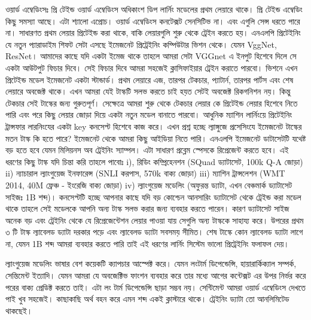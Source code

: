 \documentclass{book}
\begin{document}
ওয়ার্ড এম্বেডিংসঃ প্রি টেইন্ড ওয়ার্ড এম্বেডিংস অধিকাংশ ডিপ লার্নিং মডেলের প্রথম লেয়ারে থাকে। প্রি টেইন্ড এম্বেডিং কিছু সমস্যা আছে। এটা শ্যালো এপ্রোচ। ওয়ার্ড এম্বেডিংস কনটেক্সট সেনসিটিভ না। এবং এগুলি সেন্স ধরতে পারে না। সাধারণত প্রথম লেয়ার প্রিটেইন্ড করা থাকে, বাকি লেয়ারগুলি শুরু থেকে ট্রেইন করতে হয়। এনএলপি প্রিটেইনিং যে নতুন প্যারাডাইম শিফট সেটা এসছে ইমেজনেট প্রিট্রেইনিং কম্পিউটার ভিশন থেকে। যেমন VggNet, ResNet। আমাদের কাছে যদি একটা ইমেজ থাকে তাহলে আমরা সেটা VGGnet এ ইনপুট হিশেবে দিলে সে একটা আউটপুট ফিচার দিবে। সেই ফিচার দিবে আমরা সহজেই ক্লাসিফাইয়ার ট্রেইন করাতে পারবো। ভিশনে এখন প্রিটেইন্ড মডেল ইমেজনেট একটা স্টান্ডার্ড। প্রথম লেয়ারে এজ, তারপর টেকচার, প্যাটার্ন, তারপর পার্টস এবং শেষ লেয়ারে অবজেক্ট থাকে। এখন আমরা যেই টাস্কটি সলভ করতে চাই হয়ত সেটই অবজেক্ট রিকগনিশন নয়। কিন্তু টেকচার সেই টাস্কের জন্য গুরুতপূর্ণ। সেক্ষেত্রে আমরা শুরু থেকে টেকচার লেয়ার কে প্রিটেইন্ড লেয়ার হিশেবে নিতে পারি এবং পরে কিছু লেয়ার জোড়া দিয়ে একটা নতুন মডেল বানাতে পারবো। আধুনিক ম্যাশিন লার্নিংয়ে প্রিটেইনিং ট্রান্সফার লারনিংযের একটা key কনসেপ্ট হিশেবে কাজ করে। এখন প্রশ্ন হচ্ছে ল্যাঙ্গুজে প্রসেসিংযে ইমেজনেট টাস্কের মতন টাস্ক কি হতে পারে? ইমেজনেট থেকে আমরা কিছু আইডিয়া নিতে পারি। এনএলপি ইমেজনেট ডাটাসেটটি যথেষ্ট বড় হতে হবে যেমন মিলিয়নস অব ট্রেইনিং স্যাম্পল। এটা সাধারণ প্রব্লেম স্পেসকে রিপ্রেজেন্ট করতে হবে। এই ধরণের কিছু টাস্ক যদি চিন্তা করি তাহলে পাবোঃ i), রিডিং কম্প্রিহেনশন (SQuad ড্যাটাসেট, 100k Q-A জোড়া)  ii) ন্যাচারাল ল্যাংগুয়েজ ইনফারেন্স (SNLI করপাস, 570k বাক্য জোড়া) iii) ম্যাশিন ট্রান্সলেশন (WMT 2014, 40M ফ্রেঞ্চ - ইংরেজি বাক্য জোড়া)  iv) ল্যাংগুয়েজ মডেলিং (অফুরন্ত ড্যাটা, এখন বেঞ্চমার্ক ড্যাটাসেট সাইজঃ 1B শব্দ)। কনসেপ্টটি হচ্ছে আপনার কাছে যদি বড় কোশ্চেন আনসারিং ড্যাটাসেট থেকে ট্রেইন্ড করা মডেল থাকে তাহলে সেই মডেলকে আপনি অন্য টাস্ক সলভ করার জন্য ব্যবহার করতে পারেন। কারণ ড্যাটাসেট সাইজ অনেক বড় এবং ট্রেইনিং থেকে যে রিপ্রেজেন্টেশন লেয়ার পাওয়া যায় সেগুলি অন্য টাস্ককে সাহায্য করে। উপরের প্রথম ৩ টি টাস্ক ল্যাবেলড ড্যাটা দরকার পড়ে এবং ল্যাবেলড ড্যাটা সবসময় সীমিত। শেষ টাস্কে কোন ল্যাবেলড ড্যাটা লাগে না, যেমন 1B শব্দ আমরা ব্যবহার করতে পারি তাই এই ধরণের লার্নিং সিস্টেম ভালো প্রিট্রেইনিং ফলাফল দেয়। 

ল্যাংগুয়েজ মডেলিং ভাষার বেশ কয়েকটি ক্যাপচার আস্পেক্ট করে। যেমন লংটার্ম ডিপেন্ডেন্সি, হায়ারার্কিক্যাল সম্পর্ক, সেন্তিমেন্ট ইত্যাদি। যেমন আমরা যে অবজেক্টিভ ফাংশন ব্যবহার করে তার মধ্যে আগের কন্টেক্সট এর উপর নির্ভর করে পরের বাক্য প্রেডিক্ট করতে তাই। এটা লং টার্ম ডিপেন্ডেন্সি ছাড়া সম্ভব নয়। সেন্টিমেন্ট আমরা ওয়ার্ড এম্বেডিংস দেখতে পাই খুব সহজেই। কাছাকাছি অর্থ বহন করে এমন শব্দ একই ক্লাস্টারে থাকে। ট্রেইনিং ড্যাটা তো আনলিমিটেড থাকছেই।  
\end{document}

